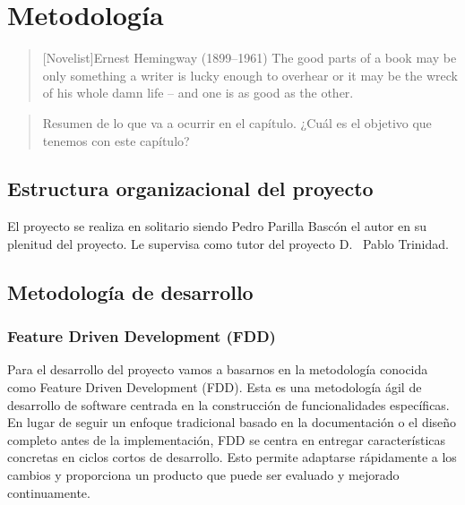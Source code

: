\chapter{Metodología}

\begin{quotation}[Novelist]{Ernest Hemingway (1899--1961)}
The good parts of a book may be only something a writer is lucky enough to overhear or it may be the wreck of his whole damn life -- and one is as good as the other.
\end{quotation}

\begin{abstract}
Resumen de lo que va a ocurrir en el capítulo. ¿Cuál es el objetivo que tenemos con este capítulo?
\end{abstract}

\section{Estructura organizacional del proyecto}

El proyecto se realiza en solitario siendo Pedro Parilla Bascón el autor en su plenitud del proyecto. Le supervisa como tutor del proyecto D.~ Pablo Trinidad.

\section{Metodología de desarrollo}

\subsection{Feature Driven Development (FDD)}
Para el desarrollo del proyecto vamos a basarnos en la metodología conocida como Feature Driven Development (FDD). Esta es una metodología ágil de desarrollo de software centrada en la construcción de funcionalidades específicas. En lugar de seguir un enfoque tradicional basado en la documentación o el diseño completo antes de la implementación, FDD se centra en entregar características concretas en ciclos cortos de desarrollo. Esto permite adaptarse rápidamente a los cambios y proporciona un producto que puede ser evaluado y mejorado continuamente.
